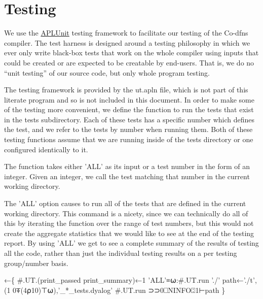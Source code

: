 \documentclass{article}%
\begin{document}
\section{Testing}

We use the \href{https://github.com/Co-dfns/APLUnit}{APLUnit}
testing framework to facilitate our testing of the Co-dfns compiler.
The test harness is designed around a testing philosophy in which we
ever only write black-box tests that work on the whole compiler
using inputs that could be created or are expected to be creatable
by end-users.
That is, we do no ``unit testing'' of our source code,
but only whole program testing.

The testing framework is provided by the {\Tt{}ut.apln\nwendquote} file,
which is not part of this literate program and so is not included in
this document.
In order to make some of the testing more convenient,
we define the function {\Tt{}\nwendquote} to run the tests
that exist in the {\Tt{}tests{\nwbackslash}\nwendquote} subdirectory.
Each of these tests has a specific number which defines the test,
and we refer to the tests by number when running them.
Both of these testing functions assume that we are running inside
of the {\Tt{}tests{\nwbackslash}\nwendquote} directory or one configured identically to it.

The {\Tt{}\nwendquote} function takes either {\Tt{}'ALL'\nwendquote} as its input or a test
number in the form of an integer.
Given an integer, we call the test matching that number in the
current working directory.

The {\Tt{}'ALL'\nwendquote} option causes {\Tt{}\nwendquote} to run all of the tests that are
defined in the current working directory.
This command is a nicety, since we can technically do all of this
by iterating the {\Tt{}\nwendquote} function over the range of test numbers,
but this would not create the aggregate statistics that we would
like to see at the end of the testing report.
By using {\Tt{}'ALL'\nwendquote} we get to see a complete summary of the
results of testing all the code,
rather than just the individual testing results on a per testing
group/number basis.

\nwenddocs{}\endmoddef\nwstartdeflinemarkup\nwenddeflinemarkup
{}←\{
        #.UT.(print_passed print_summary)←1
        'ALL'≡⍵:#.UT.run './'
        path←'./t',(1 0⍕(4⍴10)⊤⍵),'_*_tests.dyalog'
        #.UT.run ⊃⊃0⎕NINFO⍠1⊢path
\}
\eatline
{}\nwendcode{}\nwdocspar
\end{document}
